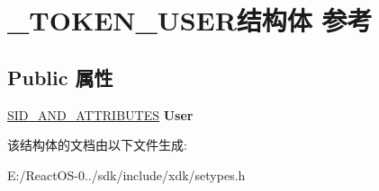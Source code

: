 \hypertarget{struct___t_o_k_e_n___u_s_e_r}{}\section{\+\_\+\+T\+O\+K\+E\+N\+\_\+\+U\+S\+E\+R结构体 参考}
\label{struct___t_o_k_e_n___u_s_e_r}
\subsection*{Public 属性}
\begin{DoxyCompactItemize}
\item 
\mbox{\label{struct___t_o_k_e_n___u_s_e_r_a6ff4d81245f39eecbe73e61392a3ebda}} 
\hyperlink{struct___s_i_d___a_n_d___a_t_t_r_i_b_u_t_e_s}{S\+I\+D\+\_\+\+A\+N\+D\+\_\+\+A\+T\+T\+R\+I\+B\+U\+T\+ES} {\bfseries User}
\end{DoxyCompactItemize}


该结构体的文档由以下文件生成\+:\begin{DoxyCompactItemize}
\item 
E\+:/\+React\+O\+S-\/0../sdk/include/xdk/setypes.\+h\end{DoxyCompactItemize}
